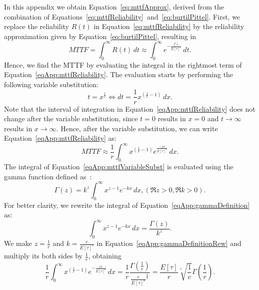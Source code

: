 In this appendix we obtain Equation~\ref{eq:mttfApprox}, derived from the combination of Equations~\ref{eq:mttfReliability}~and~\ref{eq:burtilPittel}.
First, we replace the reliability $R(t)$ in Equation~\ref{eq:mttfReliability} by the reliability approximation given by 
Equation~\ref{eq:burtilPittel}, resulting in
\begin{equation}
MTTF = \int_{0}^{\infty} R(t) \, dt \approx \int_{0}^{\infty} e^{-\frac{t^rc}{{E[\tau]}^r}} \, dt.
\label{eqApp:mttfReliability}
\end{equation}
Hence, we find the MTTF by evaluating the integral in the rightmost term of Equation~\ref{eqApp:mttfReliability}.
The evaluation starts by performing the following variable substitution: 
\begin{equation}
t=x^{\frac{1}{r}} \Leftrightarrow  dt = \frac{1}{r}x^{\left (\frac{1}{r}-1\right )} \, dx.
\end{equation}
Note that the interval of integration in Equation~\ref{eqApp:mttfReliability} does not change after the variable substitution, since $t=0$ results in 
$x=0$ and $t \rightarrow \infty$ results in $x \rightarrow \infty$.
Hence, after the variable substitution, we can write Equation~\ref{eqApp:mttfReliability} as:
\begin{equation}
MTTF \approx \frac{1}{r}\int_{0}^{\infty} x^{\left ( \frac{1}{r} - 1\right )} e^{\frac{-xc}{{E[\tau]}^r}} \, dx.
\label{eqApp:mttfVariableSubst}
\end{equation}
The integral of Equation~\ref{eqApp:mttfVariableSubst} is evaluated using the gamma function defined as~\cite{abramowitz1970handbook}:
\begin{equation}
\Gamma(z) =  k^z \int_{0}^{\infty} x^{z-1}e^{-kx} \, dx, (\Re z > 0 , \Re k > 0).
\label{eqApp:gammaDefinition}
\end{equation}
For better clarity, we rewrite the integral of Equation~\ref{eqApp:gammaDefinition} as:
\begin{equation}
\int_{0}^{\infty} x^{z-1}e^{-kx} \, dx = \frac{\Gamma(z)}{k^z}.
\label{eqApp:gammaDefinitionRew}
\end{equation}
We make $z = \frac{1}{r}$ and $k=\frac{c}{{E[\tau]}^r}$ in Equation~\ref{eqApp:gammaDefinitionRew} and multiply its both sides by $\frac{1}{r}$, obtaining
\begin{equation}
\frac{1}{r} \int_{0}^{\infty} x^{\left (\frac{1}{r}-1\right )}e^{-\frac{xc}{{E[\tau]}^r}} \, dx = \frac{1}{r}\frac{\Gamma \left (\frac{1}{r} \right)}{{\frac{c}{{E[\tau]}^r}}^{\frac{1}{r}}} = \frac{E[\tau]}{r}\sqrt[r]{\frac{1}{c}} \Gamma \left (  \frac{1}{r} \right ).
\label{eqApp:gammaDefinitionSubst}
\end{equation}

